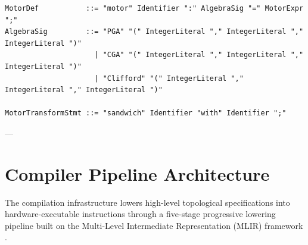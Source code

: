 \begin{lstlisting}[language={}]
MotorDef           ::= "motor" Identifier ":" AlgebraSig "=" MotorExpr ";"
AlgebraSig         ::= "PGA" "(" IntegerLiteral "," IntegerLiteral "," IntegerLiteral ")"
                     | "CGA" "(" IntegerLiteral "," IntegerLiteral "," IntegerLiteral ")"
                     | "Clifford" "(" IntegerLiteral "," IntegerLiteral "," IntegerLiteral ")"

MotorTransformStmt ::= "sandwich" Identifier "with" Identifier ";"
\end{lstlisting}

---

\section{Compiler Pipeline Architecture}
\label{sec:compiler_pipeline}

The \ToposLang{} compilation infrastructure lowers high-level topological specifications into hardware-executable instructions through a five-stage progressive lowering pipeline built on the Multi-Level Intermediate Representation (MLIR) framework \cite{lattner2021mlir}.

